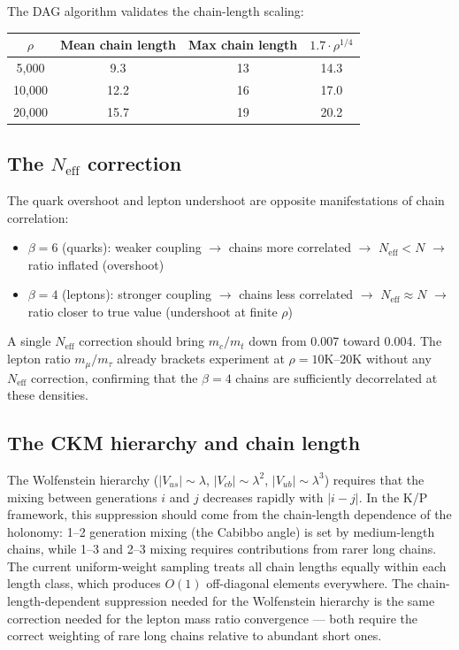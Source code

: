 \documentclass[11pt,letterpaper]{article}
\begin{document}
The DAG algorithm validates the chain-length scaling:
\begin{center}
\begin{tabular}{@{}cccc@{}}
\toprule
$\rho$ & Mean chain length & Max chain length & $1.7 \cdot \rho^{1/4}$ \\
\midrule
5{,}000 & 9.3 & 13 & 14.3 \\
10{,}000 & 12.2 & 16 & 17.0 \\
20{,}000 & 15.7 & 19 & 20.2 \\
\bottomrule
\end{tabular}
\end{center}

\subsection{The $N_{\mathrm{eff}}$ correction}

The quark overshoot and lepton undershoot are opposite manifestations
of chain correlation:
\begin{itemize}[nosep]
  \item $\beta = 6$ (quarks): weaker coupling $\to$ chains more
    correlated $\to$ $N_{\mathrm{eff}} < N$ $\to$ ratio inflated (overshoot)
  \item $\beta = 4$ (leptons): stronger coupling $\to$ chains less
    correlated $\to$ $N_{\mathrm{eff}} \approx N$ $\to$ ratio closer
    to true value (undershoot at finite $\rho$)
\end{itemize}
A single $N_{\mathrm{eff}}$ correction should bring
$m_c/m_t$ down from 0.007 toward 0.004.  The lepton ratio
$m_\mu/m_\tau$ already brackets experiment at $\rho = 10$K--$20$K
without any $N_{\mathrm{eff}}$ correction, confirming that the
$\beta = 4$ chains are sufficiently decorrelated at these densities.

\subsection{The CKM hierarchy and chain length}

The Wolfenstein hierarchy ($|V_{us}| \sim \lambda$,
$|V_{cb}| \sim \lambda^2$, $|V_{ub}| \sim \lambda^3$) requires that
the mixing between generations $i$ and $j$ decreases rapidly with
$|i - j|$. In the K/P framework, this suppression should come from
the chain-length dependence of the holonomy: 1--2 generation mixing
(the Cabibbo angle) is set by medium-length chains, while 1--3 and
2--3 mixing requires contributions from rarer long chains. The current
uniform-weight sampling treats all chain lengths equally within each
length class, which produces $O(1)$ off-diagonal elements everywhere.
The chain-length-dependent suppression needed for the Wolfenstein
hierarchy is the same correction needed for the lepton mass ratio
convergence --- both require the correct weighting of rare long chains
relative to abundant short ones.
\end{document}
